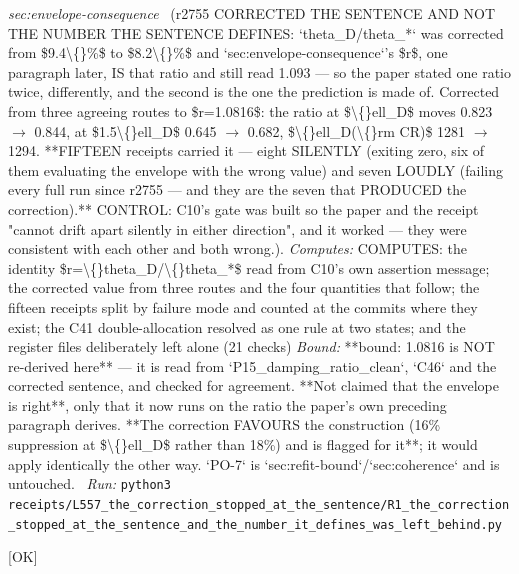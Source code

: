 \begin{description}
\textit{sec:envelope-consequence} \ (r2755 CORRECTED THE SENTENCE AND NOT THE NUMBER THE SENTENCE DEFINES: `theta\_D/theta\_*` was corrected from \$9.4\textbackslash\{\}\%\$ to \$8.2\textbackslash\{\}\%\$ and `sec:envelope-consequence`'s \$r\$, one paragraph later, IS that ratio and still read 1.093 --- so the paper stated one ratio twice, differently, and the second is the one the prediction is made of. Corrected from three agreeing routes to \$r=1.0816\$: the ratio at \$\textbackslash\{\}ell\_D\$ moves 0.823 \ensuremath{\to} 0.844, at \$1.5\textbackslash\{\}ell\_D\$ 0.645 \ensuremath{\to} 0.682, \$\textbackslash\{\}ell\_D(\textbackslash\{\}rm CR)\$ 1281 \ensuremath{\to} 1294. **FIFTEEN receipts carried it --- eight SILENTLY (exiting zero, six of them evaluating the envelope with the wrong value) and seven LOUDLY (failing every full run since r2755 --- and they are the seven that PRODUCED the correction).** CONTROL: C10's gate was built so the paper and the receipt "cannot drift apart silently in either direction", and it worked --- they were consistent with each other and both wrong.). 
\emph{Computes:} COMPUTES: the identity \$r=\textbackslash\{\}theta\_D/\textbackslash\{\}theta\_*\$ read from C10's own assertion message; the corrected value from three routes and the four quantities that follow; the fifteen receipts split by failure mode and counted at the commits where they exist; the C41 double-allocation resolved as one rule at two states; and the register files deliberately left alone (21 checks)
 \emph{Bound:} **bound: 1.0816 is NOT re-derived here** --- it is read from `P15\_damping\_ratio\_clean`, `C46` and the corrected sentence, and checked for agreement. **Not claimed that the envelope is right**, only that it now runs on the ratio the paper's own preceding paragraph derives.  **The correction FAVOURS the construction (16\% suppression at \$\textbackslash\{\}ell\_D\$ rather than 18\%) and is flagged for it**; it would apply identically the other way. `PO-7` is `sec:refit-bound`/`sec:coherence` and is untouched.
\ \emph{Run:} \texttt{python3 receipts/L557\_the\_correction\_stopped\_at\_the\_sentence/R1\_the\_correction\_stopped\_at\_the\_sentence\_and\_the\_number\_it\_defines\_was\_left\_behind.py}
\item[\label{rcpt:P1_the_pin_test_run_the_spacing_follows_the_pin_so_the_ratio_does_not}\textbf{}\quad\texttt{P1\_the\_pin\_test\_run\_the\_spacing\_follows\_the\_pin\_so\_the\_ratio\_does\_not}]\hfill\textsf{[OK]}\\

\end{description}
